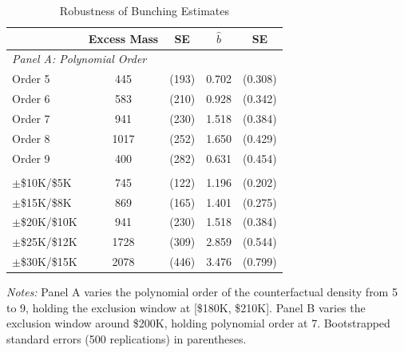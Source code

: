 \begin{table}[htbp]
\centering
\caption{Robustness of Bunching Estimates}
\label{tab:robustness}
\begin{tabular}{lcccc}
\hline\hline
 & Excess Mass & SE & $\hat{b}$ & SE \\
\hline
\multicolumn{5}{l}{\textit{Panel A: Polynomial Order}} \\
Order 5 & 445 & (193) & 0.702 & (0.308) \\
Order 6 & 583 & (210) & 0.928 & (0.342) \\
Order 7 & 941 & (230) & 1.518 & (0.384) \\
Order 8 & 1017 & (252) & 1.650 & (0.429) \\
Order 9 & 400 & (282) & 0.631 & (0.454) \\
\addlinespace
\multicolumn{5}{l}{\textit{Panel B: Exclusion Window}} \\
$\pm$\$10K/\$5K & 745 & (122) & 1.196 & (0.202) \\
$\pm$\$15K/\$8K & 869 & (165) & 1.401 & (0.275) \\
$\pm$\$20K/\$10K & 941 & (230) & 1.518 & (0.384) \\
$\pm$\$25K/\$12K & 1728 & (309) & 2.859 & (0.544) \\
$\pm$\$30K/\$15K & 2078 & (446) & 3.476 & (0.799) \\
\hline\hline
\end{tabular}
\begin{tablenotes}
\item \textit{Notes:} Panel A varies the polynomial order of the counterfactual density from 5 to 9, holding the exclusion window at [\$180K, \$210K]. Panel B varies the exclusion window around \$200K, holding polynomial order at 7. Bootstrapped standard errors (500 replications) in parentheses.
\end{tablenotes}
\end{table}
